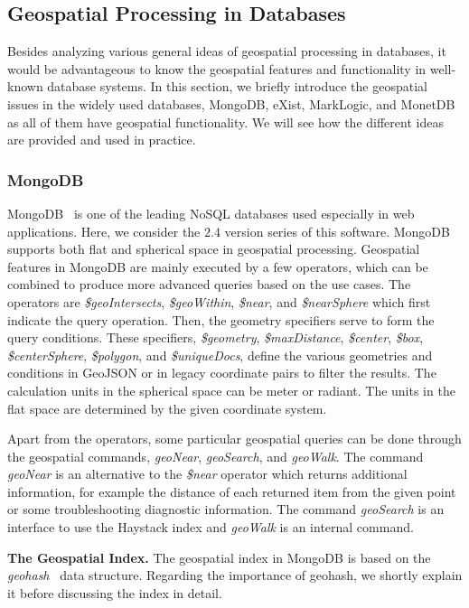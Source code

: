 \documentclass[a4paper,12pt]{article}
\begin{document}
\subsection{Geospatial Processing in Databases} 
\label{s.dbs}
Besides analyzing various general ideas of geospatial processing in databases, it would be advantageous to know the geospatial features and functionality in well-known database systems. In this section, we briefly introduce the geospatial issues in the widely used databases, MongoDB, eXist, MarkLogic, and MonetDB as all of them have geospatial functionality. We will see how the different ideas are provided and used in practice.

\subsubsection{MongoDB}
\label{mongo}
MongoDB~\cite{mongogeneral2010,mongoinaction2011} is one of the leading NoSQL databases used especially in web applications. Here, we consider the $2.4$ version series of this software. MongoDB supports both flat and spherical space in geospatial processing. Geospatial features in MongoDB are mainly executed by a few operators, which can be combined to produce more advanced queries based on the use cases. 
The operators are \textit{\$geo\-Intersects}, \textit{\$geo\-Within}, \textit{\$near}, and \textit{\$near\-Sphere} which first indicate the query operation. Then, the geometry specifiers serve to form the query conditions. These specifiers, \textit{\$geo\-metry}, \textit{\$max\-Distance}, \textit{\$center}, \textit{\$box}, \textit{\$center\-Sphere}, \textit{\$polygon}, and \textit{\$unique\-Docs}, define the various geo\-metries and conditions in GeoJSON or in legacy coordinate pairs to filter the results. The calculation units in the spherical space can be meter or radiant. The units in the flat space are determined by the given coordinate system. 

Apart from the operators, some particular geospatial queries can be done through the geospatial commands, 
\textit{geo\-Near}, \textit{geo\-Search}, and \textit{geo\-Walk}. The command \textit{geo\-Near} is an alternative to the \textit{\$near} operator which returns additional information, for example the distance of each returned item from the given point or some troubleshooting diagnostic information. The command \textit{geo\-Search} is an interface to use the Haystack index and \textit{geo\-Walk} is an internal command.

\textbf{The Geospatial Index.}
The geospatial index in MongoDB is based on the \textit{geo\-hash}~\cite{www/geohash} data structure. Regarding the importance of geohash, we shortly explain it before discussing the index in detail.
\end{document}
